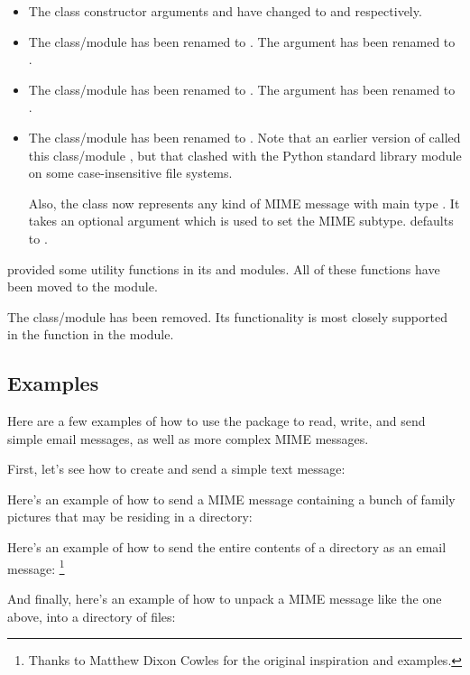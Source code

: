 \begin{itemize}
\item The  class constructor arguments 
      and  have changed to  and
       respectively.

\item The  class/module has been renamed to
      .  The  argument has been renamed to
      .

\item The  class/module has been renamed to
      .  The  argument has been renamed to
      .

\item The  class/module has been renamed to
      .  Note that an earlier version of
       called this class/module , but
      that clashed with the Python standard library module
       on some case-insensitive file systems.

      Also, the  class now represents any kind of
      MIME message with main type .  It takes an
      optional argument  which is used to set the MIME
      subtype.   defaults to .
\end{itemize}

 provided some utility functions in its
 and  modules.  All of these functions
have been moved to the  module.

The  class/module has been removed.  Its functionality
is most closely supported in the 
function in the  module.

\subsection{Examples}

Here are a few examples of how to use the  package to
read, write, and send simple email messages, as well as more complex
MIME messages.

First, let's see how to create and send a simple text message:



Here's an example of how to send a MIME message containing a bunch of
family pictures that may be residing in a directory:



Here's an example of how to send the entire contents of a directory as
an email message:
\footnote{Thanks to Matthew Dixon Cowles for the original inspiration
          and examples.}



And finally, here's an example of how to unpack a MIME message like
the one above, into a directory of files:


